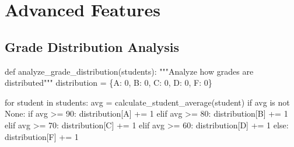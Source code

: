 \documentclass[
  letterpaper,
  DIV=11,
  numbers=noendperiod,
  oneside]{scrreprt}
\newenvironment{Shaded}{}{}
\newcommand{\CommentTok}[1]{\textcolor[rgb]{0.42,0.45,0.49}{#1}}
\newcommand{\ControlFlowTok}[1]{\textcolor[rgb]{0.84,0.23,0.29}{#1}}
\newcommand{\DecValTok}[1]{\textcolor[rgb]{0.00,0.36,0.77}{#1}}
\newcommand{\KeywordTok}[1]{\textcolor[rgb]{0.84,0.23,0.29}{#1}}
\newcommand{\NormalTok}[1]{\textcolor[rgb]{0.14,0.16,0.18}{#1}}
\newcommand{\OperatorTok}[1]{\textcolor[rgb]{0.14,0.16,0.18}{#1}}
\newcommand{\StringTok}[1]{\textcolor[rgb]{0.01,0.18,0.38}{#1}}
\newcommand{\VariableTok}[1]{\textcolor[rgb]{0.89,0.38,0.04}{#1}}
\begin{document}
\section{Advanced Features}\label{advanced-features}

\subsection{Grade Distribution
Analysis}\label{grade-distribution-analysis}

\begin{Shaded}
\begin{Highlighting}[]
\KeywordTok{def}\NormalTok{ analyze\_grade\_distribution(students):}
    \CommentTok{"""Analyze how grades are distributed"""}
\NormalTok{    distribution }\OperatorTok{=}\NormalTok{ \{}\StringTok{\textquotesingle{}A\textquotesingle{}}\NormalTok{: }\DecValTok{0}\NormalTok{, }\StringTok{\textquotesingle{}B\textquotesingle{}}\NormalTok{: }\DecValTok{0}\NormalTok{, }\StringTok{\textquotesingle{}C\textquotesingle{}}\NormalTok{: }\DecValTok{0}\NormalTok{, }\StringTok{\textquotesingle{}D\textquotesingle{}}\NormalTok{: }\DecValTok{0}\NormalTok{, }\StringTok{\textquotesingle{}F\textquotesingle{}}\NormalTok{: }\DecValTok{0}\NormalTok{\}}
    
    \ControlFlowTok{for}\NormalTok{ student }\KeywordTok{in}\NormalTok{ students:}
\NormalTok{        avg }\OperatorTok{=}\NormalTok{ calculate\_student\_average(student)}
        \ControlFlowTok{if}\NormalTok{ avg }\KeywordTok{is} \KeywordTok{not} \VariableTok{None}\NormalTok{:}
            \ControlFlowTok{if}\NormalTok{ avg }\OperatorTok{\textgreater{}=} \DecValTok{90}\NormalTok{:}
\NormalTok{                distribution[}\StringTok{\textquotesingle{}A\textquotesingle{}}\NormalTok{] }\OperatorTok{+=} \DecValTok{1}
            \ControlFlowTok{elif}\NormalTok{ avg }\OperatorTok{\textgreater{}=} \DecValTok{80}\NormalTok{:}
\NormalTok{                distribution[}\StringTok{\textquotesingle{}B\textquotesingle{}}\NormalTok{] }\OperatorTok{+=} \DecValTok{1}
            \ControlFlowTok{elif}\NormalTok{ avg }\OperatorTok{\textgreater{}=} \DecValTok{70}\NormalTok{:}
\NormalTok{                distribution[}\StringTok{\textquotesingle{}C\textquotesingle{}}\NormalTok{] }\OperatorTok{+=} \DecValTok{1}
            \ControlFlowTok{elif}\NormalTok{ avg }\OperatorTok{\textgreater{}=} \DecValTok{60}\NormalTok{:}
\NormalTok{                distribution[}\StringTok{\textquotesingle{}D\textquotesingle{}}\NormalTok{] }\OperatorTok{+=} \DecValTok{1}
            \ControlFlowTok{else}\NormalTok{:}
\NormalTok{                distribution[}\StringTok{\textquotesingle{}F\textquotesingle{}}\NormalTok{] }\OperatorTok{+=} \DecValTok{1}
    

\end{Highlighting}
\end{Shaded}
\end{document}
